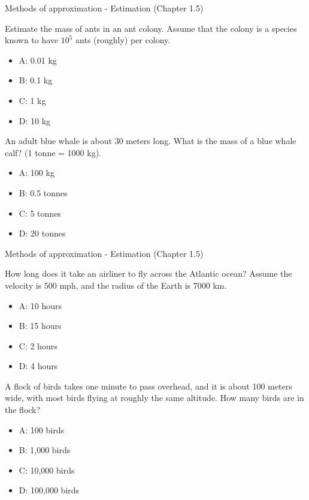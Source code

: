 \documentclass{beamer}
\begin{document}
\begin{frame}{Methods of approximation - Estimation (Chapter 1.5)}
\small
\begin{minipage}[b]{0.45\linewidth}
Estimate the mass of ants in an ant colony.  Assume that the colony is a species known to have $10^5$ ants (roughly) per colony.
\begin{itemize}
\item A: 0.01 kg
\item B: 0.1 kg
\item C: 1 kg
\item D: 10 kg
\end{itemize}
\end{minipage}
\hspace{0.5cm}
\begin{minipage}[b]{0.45\linewidth}
An adult blue whale is about 30 meters long.  What is the mass of a blue whale calf? (1 tonne = 1000 kg).
\vspace{0.55cm}
\begin{itemize}
\item A: 100 kg
\item B: 0.5 tonnes
\item C: 5 tonnes
\item D: 20 tonnes
\end{itemize}
\end{minipage}
\end{frame}

\begin{frame}{Methods of approximation - Estimation (Chapter 1.5)}
\small
\begin{minipage}[b]{0.45\linewidth}
How long does it take an airliner to fly across the Atlantic ocean?  Assume the velocity is 500 mph, and the radius of the Earth is 7000 km.
\vspace{0.6cm}
\begin{itemize}
\item A: 10 hours
\item B: 15 hours
\item C: 2 hours
\item D: 4 hours
\end{itemize}
\end{minipage}
\hspace{0.5cm}
\begin{minipage}[b]{0.45\linewidth}
A flock of birds takes one minute to pass overhead, and it is about 100 meters wide, with most birds flying at roughly the same altitude.  How many birds are in the flock?
\vspace{0.1cm}
\begin{itemize}
\item A: 100 birds
\item B: 1,000 birds
\item C: 10,000 birds
\item D: 100,000 birds
\end{itemize}
\end{minipage}
\end{frame}
\end{document}
